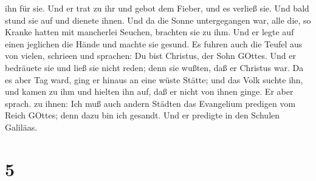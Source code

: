 ihn für sie.  Und er trat zu ihr und gebot dem Fieber, und
es verließ sie. Und bald stund sie auf und dienete ihnen. 
Und da die Sonne untergegangen war, alle die, so Kranke hatten mit
mancherlei Seuchen, brachten sie zu ihm. Und er legte auf einen
jeglichen die Hände und machte sie gesund.  Es fuhren auch
die Teufel aus von vielen, schrieen und sprachen: Du bist Christus, der
Sohn GOttes. Und er bedräuete sie und ließ sie nicht reden; denn sie
wußten, daß er Christus war.  Da es aber Tag ward, ging er
hinaus an eine wüste Stätte; und das Volk suchte ihn, und kamen zu ihm
und hielten ihn auf, daß er nicht von ihnen ginge.  Er aber
sprach. zu ihnen: Ich muß auch andern Städten das Evangelium predigen
vom Reich GOttes; denn dazu bin ich gesandt.  Und er
predigte in den Schulen Galiläas.

\hypertarget{section-4}{%
\section{5}\label{section-4}}

